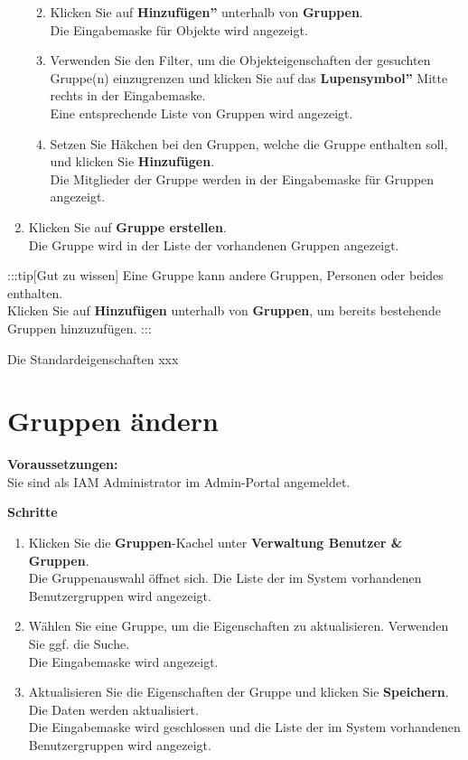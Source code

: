 \documentclass[
  letterpaper,
  DIV=11,
  numbers=noendperiod]{scrreprt}
\providecommand{\tightlist}{%
  \setlength{\itemsep}{0pt}\setlength{\parskip}{0pt}}\usepackage{longtable,booktabs,array}
\begin{document}
\begin{enumerate}
  \begin{enumerate}
  \def\labelenumii{\arabic{enumii}.}
  \tightlist
  \item
    Klicken Sie auf \textbf{Hinzufügen''} unterhalb von
    \textbf{Gruppen}.\\
    Die Eingabemaske für Objekte wird angezeigt.
  \item
    Verwenden Sie den Filter, um die Objekteigenschaften der gesuchten
    Gruppe(n) einzugrenzen und klicken Sie auf das
    \textbf{Lupensymbol''} Mitte rechts in der Eingabemaske.\\
    Eine entsprechende Liste von Gruppen wird angezeigt.
  \item
    Setzen Sie Häkchen bei den Gruppen, welche die Gruppe enthalten
    soll, und klicken Sie \textbf{Hinzufügen}.\\
    Die Mitglieder der Gruppe werden in der Eingabemaske für Gruppen
    angezeigt.
  \end{enumerate}
\item
  Klicken Sie auf \textbf{Gruppe erstellen}.\\
  Die Gruppe wird in der Liste der vorhandenen Gruppen angezeigt.
\end{enumerate}

:::tip{[}Gut zu wissen{]} Eine Gruppe kann andere Gruppen, Personen oder
beides enthalten.\\
Klicken Sie auf \textbf{Hinzufügen} unterhalb von \textbf{Gruppen}, um
bereits bestehende Gruppen hinzuzufügen. :::

Die Standardeigenschaften xxx

\section{Gruppen ändern}\label{gruppen-uxe4ndern}

\textbf{Voraussetzungen:}\\
Sie sind als IAM Administrator im Admin-Portal angemeldet.

\textbf{Schritte}

\begin{enumerate}
\def\labelenumi{\arabic{enumi}.}
\item
  Klicken Sie die \textbf{Gruppen}-Kachel unter \textbf{Verwaltung
  Benutzer \& Gruppen}.\\
  Die Gruppenauswahl öffnet sich. Die Liste der im System vorhandenen
  Benutzergruppen wird angezeigt.
\item
  Wählen Sie eine Gruppe, um die Eigenschaften zu aktualisieren.
  Verwenden Sie ggf. die Suche.\\
  Die Eingabemaske wird angezeigt.
\item
  Aktualisieren Sie die Eigenschaften der Gruppe und klicken Sie
  \textbf{Speichern}.\\
  Die Daten werden aktualisiert.\\
  Die Eingabemaske wird geschlossen und die Liste der im System
  vorhandenen Benutzergruppen wird angezeigt.
\end{enumerate}
\end{document}

